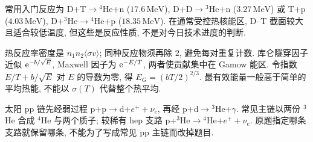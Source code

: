 常用入门反应为 D+T$\to{}^4$He+n ($17.6\,\mathrm{MeV}$), D+D$\to{}^3$He+n ($3.27\,\mathrm{MeV}$) 或 T+p ($4.03\,\mathrm{MeV}$), D+$^3$He$\to{}^4$He+p ($18.35\,\mathrm{MeV}$). 在通常受控热核能区, D--T 截面较大且适合较低温度, 但这些是反应性质, 不是对今日技术进度的判断.

热反应率密度是 $n_1n_2\langle\sigma v\rangle$; 同种反应物须再除 $2$, 避免每对重复计数. 库仑隧穿因子近似 $\mathrm e^{-b/\sqrt E}$, Maxwell 因子为 $\mathrm e^{-E/T}$, 两者使贡献集中在 Gamow 能区. 令指数 $E/T+b/\sqrt E$ 对 $E$ 的导数为零, 得 $E_G=(bT/2)^{2/3}$. 最有效能量一般高于简单的平均热能, 不能以 $\sigma(T)$ 代替整个热平均.

太阳 pp 链先经弱过程 p+p$\to$d+$e^++\nu_e$, 再经 p+d$\to{}^3$He+$\gamma$. 常见主链以两份 ${}^3$He 合成 ${}^4$He 与两个质子; 较稀有 hep 支路 p+$^3$He$\to{}^4$He+$e^++\nu_e$. 原题指定哪条支路就保留哪条, 不能为了写成常见 pp 主链而改掉题目.
